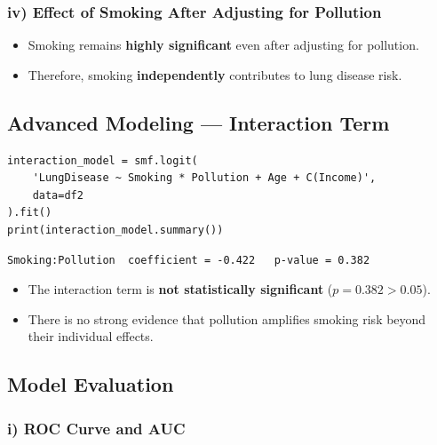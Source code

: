\documentclass[12pt,a4paper]{article}
\begin{document}
\subsubsection{iv) Effect of Smoking After Adjusting for Pollution}
\begin{interpbox}
\begin{itemize}[noitemsep]
  \item Smoking remains \textbf{highly significant} even after adjusting for pollution.
  \item Therefore, smoking \textbf{independently} contributes to lung disease risk.
\end{itemize}
\end{interpbox}

\subsection{Advanced Modeling — Interaction Term}

\begin{lstlisting}
interaction_model = smf.logit(
    'LungDisease ~ Smoking * Pollution + Age + C(Income)',
    data=df2
).fit()
print(interaction_model.summary())
\end{lstlisting}

\begin{outputbox}
\begin{verbatim}
Smoking:Pollution  coefficient = -0.422   p-value = 0.382
\end{verbatim}
\end{outputbox}

\begin{interpbox}
\begin{itemize}[noitemsep]
  \item The interaction term is \textbf{not statistically significant} ($p = 0.382 > 0.05$).
  \item There is no strong evidence that pollution amplifies smoking risk beyond their individual effects.
\end{itemize}
\end{interpbox}

\subsection{Model Evaluation}

\subsubsection{i) ROC Curve and AUC}
\end{document}
